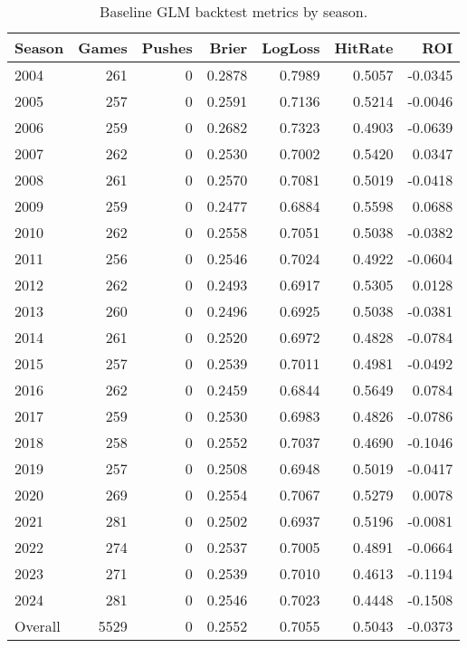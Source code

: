 \begin{table}[t]
  \centering
  \footnotesize
  \caption[Baseline GLM backtest]{Baseline GLM backtest metrics by season.}
  \label{tab:glm-baseline}
  \setlength{\tabcolsep}{3pt}\renewcommand{\arraystretch}{1.1}
  \begin{tabular}{@{} l r r r r r r @{} }
    \toprule
    Season & Games & Pushes & Brier & LogLoss & HitRate & ROI \\ 
    \midrule
      2004 & 261 & 0 & 0.2878 & 0.7989 & 0.5057 & -0.0345 \\
      2005 & 257 & 0 & 0.2591 & 0.7136 & 0.5214 & -0.0046 \\
      2006 & 259 & 0 & 0.2682 & 0.7323 & 0.4903 & -0.0639 \\
      2007 & 262 & 0 & 0.2530 & 0.7002 & 0.5420 & 0.0347 \\
      2008 & 261 & 0 & 0.2570 & 0.7081 & 0.5019 & -0.0418 \\
      2009 & 259 & 0 & 0.2477 & 0.6884 & 0.5598 & 0.0688 \\
      2010 & 262 & 0 & 0.2558 & 0.7051 & 0.5038 & -0.0382 \\
      2011 & 256 & 0 & 0.2546 & 0.7024 & 0.4922 & -0.0604 \\
      2012 & 262 & 0 & 0.2493 & 0.6917 & 0.5305 & 0.0128 \\
      2013 & 260 & 0 & 0.2496 & 0.6925 & 0.5038 & -0.0381 \\
      2014 & 261 & 0 & 0.2520 & 0.6972 & 0.4828 & -0.0784 \\
      2015 & 257 & 0 & 0.2539 & 0.7011 & 0.4981 & -0.0492 \\
      2016 & 262 & 0 & 0.2459 & 0.6844 & 0.5649 & 0.0784 \\
      2017 & 259 & 0 & 0.2530 & 0.6983 & 0.4826 & -0.0786 \\
      2018 & 258 & 0 & 0.2552 & 0.7037 & 0.4690 & -0.1046 \\
      2019 & 257 & 0 & 0.2508 & 0.6948 & 0.5019 & -0.0417 \\
      2020 & 269 & 0 & 0.2554 & 0.7067 & 0.5279 & 0.0078 \\
      2021 & 281 & 0 & 0.2502 & 0.6937 & 0.5196 & -0.0081 \\
      2022 & 274 & 0 & 0.2537 & 0.7005 & 0.4891 & -0.0664 \\
      2023 & 271 & 0 & 0.2539 & 0.7010 & 0.4613 & -0.1194 \\
      2024 & 281 & 0 & 0.2546 & 0.7023 & 0.4448 & -0.1508 \\
      Overall & 5529 & 0 & 0.2552 & 0.7055 & 0.5043 & -0.0373 \\
    \bottomrule
  \end{tabular}
\end{table}
